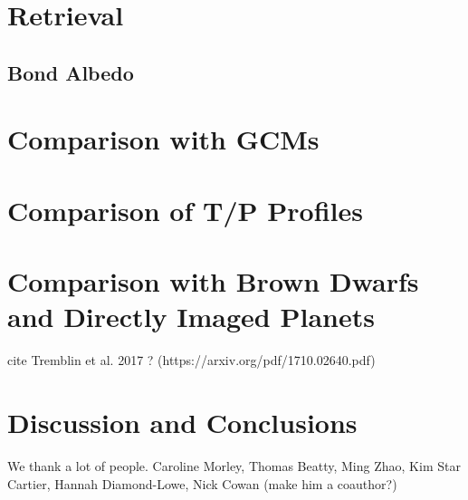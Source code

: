 \documentclass[twocolumn]{aastex61}
\begin{document}
\section{Retrieval}

\subsection{Bond Albedo}

\section{Comparison with GCMs}

\section{Comparison of T/P Profiles}

\section{Comparison with Brown Dwarfs and Directly Imaged Planets}
cite Tremblin et al. 2017 ? (https://arxiv.org/pdf/1710.02640.pdf)

\section{Discussion and Conclusions}

\acknowledgments
We thank a lot of people. Caroline Morley, Thomas Beatty, Ming Zhao, Kim Star Cartier, Hannah Diamond-Lowe, Nick Cowan (make him a coauthor?)



\end{document}
